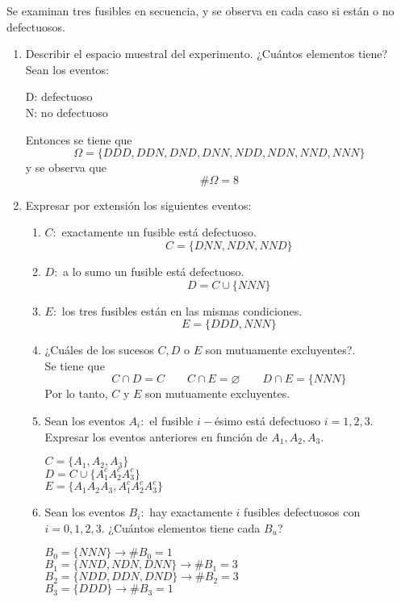 \item Se examinan tres fusibles en secuencia, y se observa en cada caso si están o no defectuosos.
    \begin{enumerate}
        \item Describir el espacio muestral del experimento. ¿Cuántos elementos tiene?\vspace{3mm}\\
            Sean los eventos:
            \begin{center}
                D: defectuoso\\
                N: no defectuoso
            \end{center}
            Entonces se tiene que
            \[\Omega=\{DDD,DDN,DND,DNN,NDD,NDN,NND,NNN\}\]
            y se observa que
            \[\#\Omega=8\]
        \item Expresar por extensión los siguientes eventos:
            \begin{enumerate}
                \item $C:$ exactamente un fusible está defectuoso.
                    \[C=\{DNN,NDN,NND\}\]
                \item $D:$ a lo sumo un fusible está defectuoso.
                    \[D=C\cup\{NNN\}\]
                \item $E:$ los tres fusibles están en las mismas condiciones.
                    \[E=\{DDD,NNN\}\]
                \item ¿Cuáles de los sucesos $C,D$ o $E$ son mutuamente excluyentes?.\e\\
                    Se tiene que\[C\cap D=C\qquad C\cap E=\varnothing\qquad D\cap E=\{NNN\}\]
                    Por lo tanto, $C$ y $E$ son mutuamente excluyentes.\e
                \item Sean los eventos $A_i:$ el fusible $i-$ésimo está defectuoso $i=1,2,3$. Expresar los eventos anteriores en función de $A_1,A_2,A_3$.
                    \begin{center}
                        $C=\{A_1,A_2,A_3\}$\\
                        $D=C\cup\{A_1^cA_2^cA_3^c\}$\\
                        $E=\{A_1A_2A_3,A_1^cA_2^cA_3^c\}$
                    \end{center}\e
                \item Sean los eventos $B_i:$ hay exactamente $i$ fusibles defectuosos con $i=0,1,2,3$. ¿Cuántos elementos tiene cada $B_u$?
                    \begin{center}
                        $B_0=\{NNN\}\to \#B_0=1$\\
                        $B_1=\{NND,NDN,DNN\}\to\#B_1=3$\\
                        $B_2=\{NDD,DDN,DND\}\to\#B_2=3$\\
                        $B_3=\{DDD\}\to\#B_3=1$
                    \end{center}
            \end{enumerate}
    \end{enumerate}